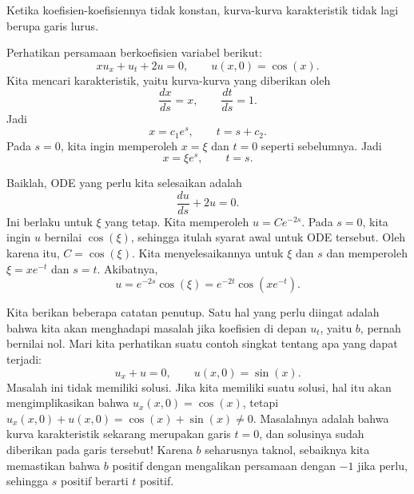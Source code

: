 Ketika koefisien-koefisiennya tidak konstan, kurva-kurva karakteristik
tidak lagi berupa garis lurus.

\begin{example}
Perhatikan persamaan berkoefisien variabel berikut:
\begin{equation*}
x u_x + u_t + 2 u = 0, \qquad u(x,0) = \cos(x) . %
\end{equation*}
Kita mencari karakteristik, yaitu kurva-kurva yang diberikan oleh
\begin{equation*}
\frac{dx}{ds} = x, \qquad \frac{dt}{ds} = 1 .
\end{equation*}
Jadi
\begin{equation*}
x = c_1 e^{s} , \qquad t = s+ c_2 .
\end{equation*}
Pada $s=0$, kita ingin memperoleh $x=\xi$ dan $t=0$ seperti sebelumnya.  Jadi
\begin{equation*}
x = \xi e^s, \qquad t = s .
\end{equation*}

Baiklah\@, ODE yang perlu kita selesaikan adalah
\begin{equation*}
\frac{du}{ds} + 2 u = 0 .
\end{equation*}
Ini berlaku untuk $\xi$ yang tetap.  Kita memperoleh $u = C e^{-2s}$.
Pada $s=0$, kita ingin $u$ bernilai
$\cos(\xi)$, sehingga itulah syarat awal untuk ODE tersebut\@.
Oleh karena itu, $C = \cos(\xi)$.
Kita menyelesaikannya untuk $\xi$ dan $s$ dan memperoleh
$\xi = xe^{-t}$ dan $s=t$.
Akibatnya,
\begin{equation*}
u = e^{-2s} \cos(\xi)= e^{-2t} \cos(xe^{-t}) .
\end{equation*}
\end{example}


Kita berikan beberapa catatan penutup.
Satu hal yang perlu diingat adalah bahwa kita akan menghadapi masalah jika
koefisien di depan $u_t$, yaitu $b$, pernah bernilai nol.
Mari kita perhatikan suatu contoh singkat tentang apa yang dapat terjadi:
\begin{equation*}
u_x + u = 0, \qquad u(x,0) = \sin(x).
\end{equation*}
Masalah ini tidak memiliki solusi.  Jika kita memiliki suatu solusi, hal itu
akan mengimplikasikan bahwa $u_x(x,0) = \cos(x)$,
tetapi $u_x(x,0) + u(x,0) = \cos(x) + \sin(x) \neq 0$.
Masalahnya adalah bahwa kurva karakteristik sekarang merupakan garis $t=0$,
dan solusinya sudah diberikan pada garis tersebut!
Karena $b$ seharusnya taknol,
sebaiknya kita memastikan bahwa $b$ positif dengan mengalikan
persamaan dengan $-1$
jika perlu, sehingga $s$ positif berarti $t$ positif.

